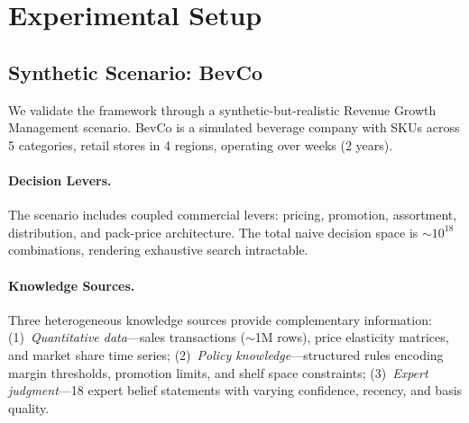 \section{Experimental Setup}
\label{sec:setup}

\subsection{Synthetic Scenario: BevCo}

We validate the framework through a synthetic-but-realistic Revenue Growth Management scenario.
BevCo is a simulated beverage company with \NSKUS{} SKUs across 5 categories, \NSTORES{} retail stores in 4 regions, operating over \NWEEKS{} weeks (2 years).

\paragraph{Decision Levers.}
The scenario includes \NLEVERS{} coupled commercial levers: pricing, promotion, assortment, distribution, and pack-price architecture.
The total naive decision space is ${\sim}10^{18}$ combinations, rendering exhaustive search intractable.

\paragraph{Knowledge Sources.}
Three heterogeneous knowledge sources provide complementary information:
(1)~\textit{Quantitative data}---sales transactions (${\sim}$1M rows), price elasticity matrices, and market share time series;
(2)~\textit{Policy knowledge}---structured rules encoding margin thresholds, promotion limits, and shelf space constraints;
(3)~\textit{Expert judgment}---18 expert belief statements with varying confidence, recency, and basis quality.

